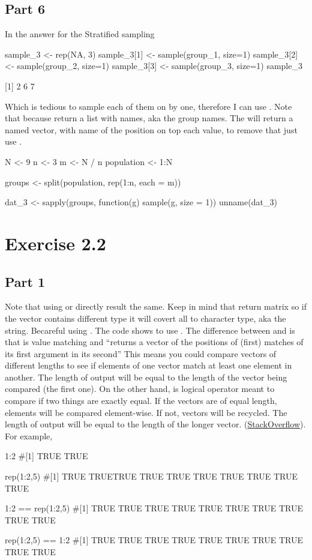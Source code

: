 \subsection{Part 6}
In the answer for the Stratified sampling 
\begin{Rblock}
    sample_3 <- rep(NA, 3)
    sample_3[1] <- sample(group_1, size=1)
    sample_3[2] <- sample(group_2, size=1)
    sample_3[3] <- sample(group_3, size=1)
    sample_3

    [1] 2 6 7
\end{Rblock}
Which is tedious to sample each of them on by one, therefore I can use . Note that because  return a list with names, aka the group names. The  will return a named vector, with name of the position on 
top each value, to remove that just use .
\begin{Rblock}
    N <- 9
    n <- 3
    m <- N / n
    population <- 1:N

    groups <- split(population, rep(1:n, each = m))

    dat_3 <- sapply(groups, function(g) sample(g, size = 1))
    unname(dat_3)
\end{Rblock}

\section{Exercise 2.2}
\subsection{Part 1}
Note that using  or  directly result the same. Keep in mind that  return matrix so if the vector contains different type it will covert all to character type, aka the string. Becareful
using . The code shows to use . The difference between  and \Rcode{==} is that  is value matching and ``returns a vector of the positions of (first) matches of its first argument in its second'' 
This means you could compare vectors of different lengths to see if elements of one vector match at least one element in another. The length of output will be equal to the length of the vector being compared (the first one). On the other hand, 
\Rcode{==} is logical operator meant to compare if two things are exactly equal. If the vectors are of equal length, elements will be compared element-wise. If not, vectors will be recycled. The length of output will be equal to the length of the 
longer vector. (\href{https://stackoverflow.com/questions/42637099/difference-between-the-and-in-operators-in-r}{StackOverflow}). For example,
\begin{Rblock}
    1:2 %
    #[1] TRUE TRUE

    rep(1:2,5) %
    #[1] TRUE TRUETRUE TRUE TRUE TRUE TRUE TRUE TRUE TRUE

    1:2 == rep(1:2,5)
    #[1] TRUE TRUE TRUE TRUE TRUE TRUE TRUE TRUE TRUE TRUE

    rep(1:2,5) == 1:2
    #[1] TRUE TRUE TRUE TRUE TRUE TRUE TRUE TRUE TRUE TRUE
\end{Rblock}


